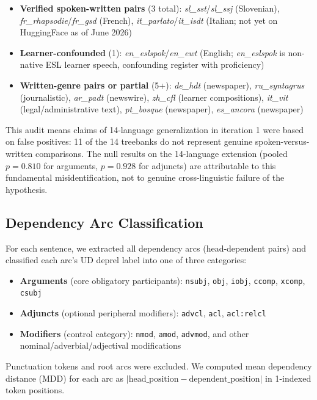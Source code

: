 \documentclass[11pt,letterpaper]{article}
\begin{document}
\begin{itemize}
  \item \textbf{Verified spoken-written pairs} (3 total): \textit{sl\_sst}/\textit{sl\_ssj} (Slovenian), \textit{fr\_rhapsodie}/\textit{fr\_gsd} (French), \textit{it\_parlato}/\textit{it\_isdt} (Italian; not yet on HuggingFace as of June 2026)
  \item \textbf{Learner-confounded} (1): \textit{en\_eslspok}/\textit{en\_ewt} (English; \textit{en\_eslspok} is non-native ESL learner speech, confounding register with proficiency)
  \item \textbf{Written-genre pairs or partial} (5+): \textit{de\_hdt} (newspaper), \textit{ru\_syntagrus} (journalistic), \textit{ar\_padt} (newswire), \textit{zh\_cfl} (learner compositions), \textit{it\_vit} (legal/administrative text), \textit{pt\_bosque} (newspaper), \textit{es\_ancora} (newspaper)
\end{itemize}

This audit means claims of 14-language generalization in iteration 1 were based on false positives: 11 of the 14 treebanks do not represent genuine spoken-versus-written comparisons. The null results on the 14-language extension (pooled $p = 0.810$ for arguments, $p = 0.928$ for adjuncts) are attributable to this fundamental misidentification, not to genuine cross-linguistic failure of the hypothesis.

\subsection{Dependency Arc Classification}

For each sentence, we extracted all dependency arcs (head-dependent pairs) and classified each arc's UD deprel label into one of three categories:

\begin{itemize}
  \item \textbf{Arguments} (core obligatory participants): \texttt{nsubj}, \texttt{obj}, \texttt{iobj}, \texttt{ccomp}, \texttt{xcomp}, \texttt{csubj}
  \item \textbf{Adjuncts} (optional peripheral modifiers): \texttt{advcl}, \texttt{acl}, \texttt{acl:relcl}
  \item \textbf{Modifiers} (control category): \texttt{nmod}, \texttt{amod}, \texttt{advmod}, and other nominal/adverbial/adjectival modifications
\end{itemize}

Punctuation tokens and root arcs were excluded. We computed mean dependency distance (MDD) for each arc as $|\text{head\_position} - \text{dependent\_position}|$ in 1-indexed token positions.
\end{document}
